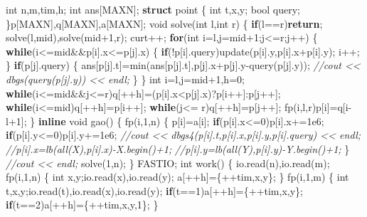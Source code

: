 \documentclass[
]{article}
\newenvironment{Shaded}{}{}
\newcommand{\CommentTok}[1]{\textcolor[rgb]{0.38,0.63,0.69}{\textit{#1}}}
\newcommand{\ControlFlowTok}[1]{\textcolor[rgb]{0.00,0.44,0.13}{\textbf{#1}}}
\newcommand{\DataTypeTok}[1]{\textcolor[rgb]{0.56,0.13,0.00}{#1}}
\newcommand{\DecValTok}[1]{\textcolor[rgb]{0.25,0.63,0.44}{#1}}
\newcommand{\FloatTok}[1]{\textcolor[rgb]{0.25,0.63,0.44}{#1}}
\newcommand{\KeywordTok}[1]{\textcolor[rgb]{0.00,0.44,0.13}{\textbf{#1}}}
\newcommand{\NormalTok}[1]{#1}
\begin{document}
\begin{Shaded}
\begin{Highlighting}[]
\DataTypeTok{int}\NormalTok{ n,m,tim,h;}
\DataTypeTok{int}\NormalTok{ ans[MAXN];}
\KeywordTok{struct}\NormalTok{ point}
\NormalTok{\{}
    \DataTypeTok{int}\NormalTok{ t,x,y;}
    \DataTypeTok{bool}\NormalTok{ query;}
\NormalTok{\}p[MAXN],q[MAXN],a[MAXN];}
\DataTypeTok{void}\NormalTok{ solve(}\DataTypeTok{int}\NormalTok{ l,}\DataTypeTok{int}\NormalTok{ r)}
\NormalTok{\{}
    \ControlFlowTok{if}\NormalTok{(l==r)}\ControlFlowTok{return}\NormalTok{; solve(l,mid),solve(mid+}\DecValTok{1}\NormalTok{,r);}
\NormalTok{    curt++;}
    \ControlFlowTok{for}\NormalTok{(}\DataTypeTok{int}\NormalTok{ i=l,j=mid+}\DecValTok{1}\NormalTok{;j\textless{}=r;j++)}
\NormalTok{    \{}
        \ControlFlowTok{while}\NormalTok{(i\textless{}=mid\&\&p[i].x\textless{}=p[j].x)}
\NormalTok{        \{}
            \ControlFlowTok{if}\NormalTok{(!p[i].query)update(p[i].y,p[i].x+p[i].y);}
\NormalTok{            i++;}
\NormalTok{        \}}
        \ControlFlowTok{if}\NormalTok{(p[j].query)}
\NormalTok{        \{}
\NormalTok{            ans[p[j].t]=min(ans[p[j].t],p[j].x+p[j].y{-}query(p[j].y));}
            \CommentTok{//cout \textless{}\textless{} dbgs(query(p[j].y)) \textless{}\textless{} endl;}
\NormalTok{        \}}
\NormalTok{    \}}
    \DataTypeTok{int}\NormalTok{ i=l,j=mid+}\DecValTok{1}\NormalTok{,h=}\DecValTok{0}\NormalTok{;}
    \ControlFlowTok{while}\NormalTok{(i\textless{}=mid\&\&j\textless{}=r)q[++h]=(p[i].x\textless{}p[j].x)?p[i++]:p[j++];}
    \ControlFlowTok{while}\NormalTok{(i\textless{}=mid)q[++h]=p[i++];}
    \ControlFlowTok{while}\NormalTok{(j\textless{}=  r)q[++h]=p[j++];}
\NormalTok{    fp(i,l,r)p[i]=q[i{-}l+}\DecValTok{1}\NormalTok{];}
\NormalTok{\}}
\KeywordTok{inline} \DataTypeTok{void}\NormalTok{ gao()}
\NormalTok{\{}
\NormalTok{    fp(i,}\DecValTok{1}\NormalTok{,n)}
\NormalTok{    \{}
\NormalTok{        p[i]=a[i];}
        \ControlFlowTok{if}\NormalTok{(p[i].x\textless{}=}\DecValTok{0}\NormalTok{)p[i].x+=}\FloatTok{1e6}\NormalTok{;}
        \ControlFlowTok{if}\NormalTok{(p[i].y\textless{}=}\DecValTok{0}\NormalTok{)p[i].y+=}\FloatTok{1e6}\NormalTok{;}
        \CommentTok{//cout \textless{}\textless{} dbgs4(p[i].t,p[i].x,p[i].y,p[i].query) \textless{}\textless{} endl;}
        \CommentTok{//p[i].x=lb(all(X),p[i].x){-}X.begin()+1;}
        \CommentTok{//p[i].y=lb(all(Y),p[i].y){-}Y.begin()+1;}
\NormalTok{    \}}
    \CommentTok{//cout \textless{}\textless{} endl;}
\NormalTok{    solve(}\DecValTok{1}\NormalTok{,n);}
\NormalTok{\}}
\NormalTok{FASTIO;}
\DataTypeTok{int}\NormalTok{ work()}
\NormalTok{\{}
\NormalTok{    io.read(n),io.read(m);}
\NormalTok{    fp(i,}\DecValTok{1}\NormalTok{,n)}
\NormalTok{    \{}
        \DataTypeTok{int}\NormalTok{ x,y;io.read(x),io.read(y);}
\NormalTok{        a[++h]=\{++tim,x,y\};}
\NormalTok{    \}}
\NormalTok{    fp(i,}\DecValTok{1}\NormalTok{,m)}
\NormalTok{    \{}
        \DataTypeTok{int}\NormalTok{ t,x,y;io.read(t),io.read(x),io.read(y);}
        \ControlFlowTok{if}\NormalTok{(t==}\DecValTok{1}\NormalTok{)a[++h]=\{++tim,x,y\};}
        \ControlFlowTok{if}\NormalTok{(t==}\DecValTok{2}\NormalTok{)a[++h]=\{++tim,x,y,}\DecValTok{1}\NormalTok{\};}
\NormalTok{    \}}


\end{Highlighting}
\end{Shaded}
\end{document}
